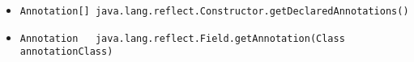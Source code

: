\documentclass[a4paper, 10pt, titlepage]{scrartcl} %
\begin{document}
\begin{itemize}
 \item \begin{scriptsize}\verb|Annotation|\hspace{0.0pt}\verb|[|\hspace{0.0pt}\verb||\hspace{0.0pt}\verb|]|\hspace{0.0pt}\verb||\hspace{0.0pt}\verb| |\hspace{0.0pt}\verb|java|\hspace{0.0pt}\verb|.|\hspace{0.0pt}\verb|lang|\hspace{0.0pt}\verb|.|\hspace{0.0pt}\verb|reflect|\hspace{0.0pt}\verb|.|\hspace{0.0pt}\verb|Constructor|\hspace{0.0pt}\verb|.|\hspace{0.0pt}\verb|getDeclaredAnnotations|\hspace{0.0pt}\verb|(|\hspace{0.0pt}\verb||\hspace{0.0pt}\verb|)|\hspace{0.0pt}\verb||\end{scriptsize}
 \item \begin{scriptsize}\verb|Annotation|\hspace{0.0pt}\verb| |\hspace{0.0pt}\verb||\hspace{0.0pt}\verb| |\hspace{0.0pt}\verb||\hspace{0.0pt}\verb| |\hspace{0.0pt}\verb|java|\hspace{0.0pt}\verb|.|\hspace{0.0pt}\verb|lang|\hspace{0.0pt}\verb|.|\hspace{0.0pt}\verb|reflect|\hspace{0.0pt}\verb|.|\hspace{0.0pt}\verb|Field|\hspace{0.0pt}\verb|.|\hspace{0.0pt}\verb|getAnnotation|\hspace{0.0pt}\verb|(|\hspace{0.0pt}\verb|Class|\hspace{0.0pt}\verb| |\hspace{0.0pt}\verb|annotationClass|\hspace{0.0pt}\verb|)|\hspace{0.0pt}\verb||\end{scriptsize}

\end{itemize}
\end{document}
